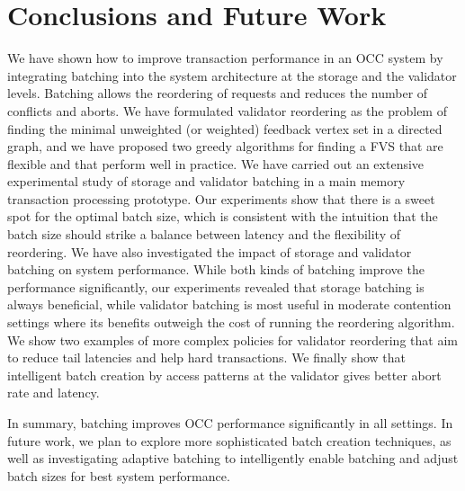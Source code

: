 \section{Conclusions and Future Work}\label{sec:conclusion}
We have shown how to improve transaction performance in an OCC system by integrating batching into the system architecture at the storage and the validator levels. Batching allows the reordering of requests and reduces the number of conflicts and aborts. We have formulated validator reordering as the problem of finding the minimal unweighted (or weighted) feedback vertex set in a directed graph, and we have proposed two greedy algorithms for finding a FVS that are flexible and that perform well in practice. We have carried out an extensive experimental study of storage and validator batching in a main memory transaction processing prototype. Our experiments show that there is a sweet spot for the optimal batch size, which is consistent with the intuition that the batch size should strike a balance between latency and the flexibility of reordering. We have also investigated the impact of storage and validator batching on system performance. While both kinds of batching improve the performance significantly, our experiments revealed that storage batching is always beneficial, while validator batching is most useful in moderate contention settings where its benefits outweigh the cost of running the reordering algorithm. We show two examples of more complex policies for validator reordering that aim to reduce tail latencies and help hard transactions. We finally show that intelligent batch creation by access patterns at the validator gives better abort rate and latency.

In summary, batching improves OCC performance significantly in all settings. In future work, we plan to explore more sophisticated batch creation techniques, as well as investigating adaptive batching to intelligently enable batching and adjust batch sizes for best system performance.


